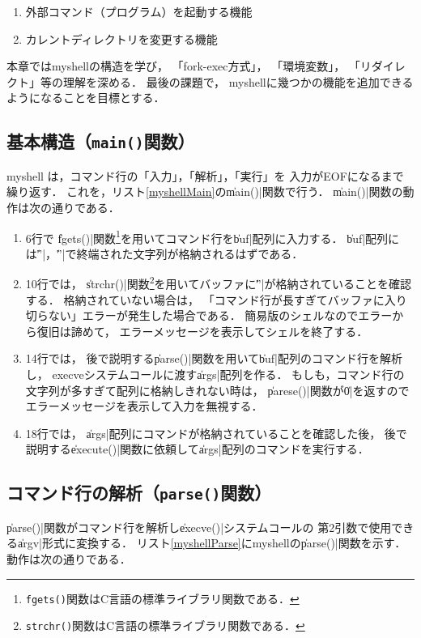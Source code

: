 \begin{enumerate}
\item 外部コマンド（プログラム）を起動する機能
\item カレントディレクトリを変更する機能
\end{enumerate}

本章ではmyshellの構造を学び，
「fork-exec方式」，
「環境変数」，
「リダイレクト」等の理解を深める．
最後の課題で，
myshellに幾つかの機能を追加できるようになることを目標とする．

\subsection{基本構造（\texttt{main()}関数）}
myshell は，コマンド行の「入力」，「解析」，「実行」を
入力がEOFになるまで繰り返す．
これを，リスト\ref{myshellMain}の\|main()|関数で行う．
\|main()|関数の動作は次の通りである．



\begin{enumerate}
\item 6行で
  \|fgets()|関数\footnote{
    \texttt{fgets()}関数はC言語の標準ライブラリ関数である．
  }を用いてコマンド行を\|buf|配列に入力する．
  \|buf|配列には\|'\n'|，\|'\0'|で終端された文字列が格納されるはずである．
\item 10行では，
  \|strchr()|関数\footnote{
    \texttt{strchr()}関数はC言語の標準ライブラリ関数である．
  }を用いてバッファに\|'\n'|が格納されていることを確認する．
  格納されていない場合は，
  「コマンド行が長すぎてバッファに入り切らない」エラーが発生した場合である．
  簡易版のシェルなのでエラーから復旧は諦めて，
  エラーメッセージを表示してシェルを終了する．
\item 14行では，
  後で説明する\|parse()|関数を用いて\|buf|配列のコマンド行を解析し，
  execveシステムコールに渡す\|args|配列を作る．
  もしも，コマンド行の文字列が多すぎて配列に格納しきれない時は，
  \|parese()|関数が\|0|を返すのでエラーメッセージを表示して入力を無視する．
\item 18行では，
  \|args|配列にコマンドが格納されていることを確認した後，
  後で説明する\|execute()|関数に依頼して\|args|配列のコマンドを実行する．
\end{enumerate}

\subsection{コマンド行の解析（\texttt{parse()}関数）}
\|parse()|関数がコマンド行を解析し\|execve()|システムコールの
第2引数で使用できる\|argv|形式に変換する．
リスト\ref{myshellParse}にmyshellの\|parse()|関数を示す．
動作は次の通りである．


